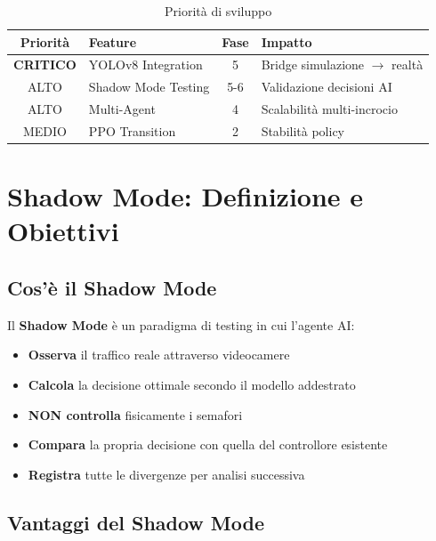 \documentclass[a4paper,11pt]{article}
\begin{document}
\begin{table}[H]
    \centering
    \begin{tabular}{clcl}
        \toprule
        \textbf{Priorità} & \textbf{Feature} & \textbf{Fase} & \textbf{Impatto} \\
        \midrule
        \textbf{CRITICO} & YOLOv8 Integration & 5 & Bridge simulazione $\rightarrow$ realtà \\
        ALTO & Shadow Mode Testing & 5-6 & Validazione decisioni AI \\
        ALTO & Multi-Agent & 4 & Scalabilità multi-incrocio \\
        MEDIO & PPO Transition & 2 & Stabilità policy \\
        \bottomrule
    \end{tabular}
    \caption{Priorità di sviluppo}
\end{table}

\section{Shadow Mode: Definizione e Obiettivi}

\subsection{Cos'è il Shadow Mode}

Il \textbf{Shadow Mode} è un paradigma di testing in cui l'agente AI:

\begin{itemize}
    \item \textbf{Osserva} il traffico reale attraverso videocamere
    \item \textbf{Calcola} la decisione ottimale secondo il modello addestrato
    \item \textbf{NON controlla} fisicamente i semafori
    \item \textbf{Compara} la propria decisione con quella del controllore esistente
    \item \textbf{Registra} tutte le divergenze per analisi successiva
\end{itemize}

\subsection{Vantaggi del Shadow Mode}
\end{document}
